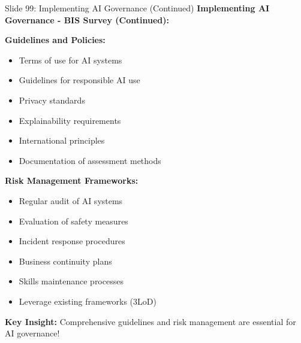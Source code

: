 \documentclass[8pt]{beamer}
\begin{document}
	\begin{frame}{Slide 99: Implementing AI Governance (Continued)}
		\fontsize{6.5}{7.5}\selectfont
		\textbf{Implementing AI Governance - BIS Survey (Continued):}
		
		\vspace{0.1cm}
		\textbf{Guidelines and Policies:}
		\begin{itemize}
			\item Terms of use for AI systems
			\item Guidelines for responsible AI use
			\item Privacy standards
			\item Explainability requirements
			\item International principles
			\item Documentation of assessment methods
		\end{itemize}
		
		\vspace{0.1cm}
		\textbf{Risk Management Frameworks:}
		\begin{itemize}
			\item Regular audit of AI systems
			\item Evaluation of safety measures
			\item Incident response procedures
			\item Business continuity plans
			\item Skills maintenance processes
			\item Leverage existing frameworks (3LoD)
		\end{itemize}
		
		\textcolor{myblue}{\textbf{Key Insight:}} Comprehensive guidelines and risk management are \textcolor{myblue}{essential for AI governance}!
	\end{frame}
	
\end{document}
